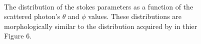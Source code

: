 \documentclass[12pt,a4paper]{article}
\begin{document}
\begin{figure}[]
 \centering
  \\
 \caption{The distribution of the stokes parameters as a function of the scattered photon's $\theta$ and $\phi$ values. These distributions are morphologically similar to the distribution acquired by \cite{krawczynski2011polarization} in thier Figure 6.  }
 \label{kraw_comparison}
 \end{figure}
\end{document}
